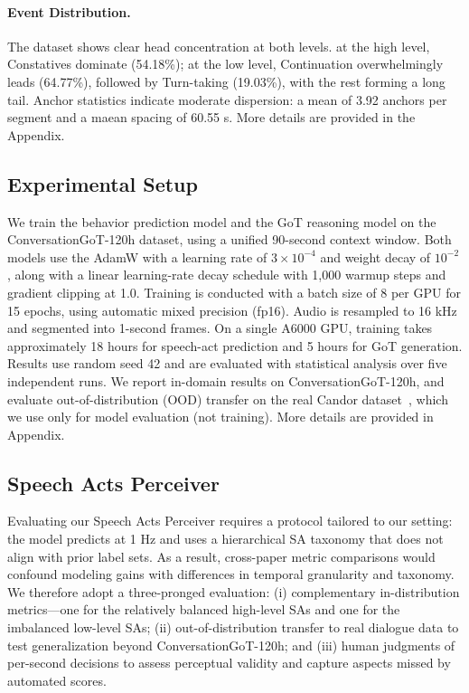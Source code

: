 \paragraph{Event Distribution.}
The dataset shows clear head concentration at both levels. at the high level, Constatives dominate (54.18\%); at the low level, Continuation overwhelmingly leads (64.77\%), followed by Turn-taking (19.03\%), with the rest forming a long tail. Anchor statistics indicate moderate dispersion: a mean of 3.92 anchors per segment and a maean spacing of 60.55 s. More details are provided in the Appendix.
\subsection{Experimental Setup}
We train the behavior prediction model and the GoT reasoning model on the ConversationGoT-120h dataset, using a unified 90-second context window. Both models use the AdamW \citep{loshchilov2017decoupled} with a learning rate of $3\times10^{-4}$ and weight decay of $10^{-2}$, along with a linear learning-rate decay schedule with 1{,}000 warmup steps and gradient clipping at 1.0. Training is conducted with a batch size of 8 per GPU for 15 epochs, using automatic mixed precision (fp16). Audio is resampled to 16 kHz and segmented into 1-second frames. On a single A6000 GPU, training takes approximately 18 hours for speech-act prediction and 5 hours for GoT generation. Results use random seed 42 and are evaluated with statistical analysis over five independent runs. We report in-domain results on ConversationGoT-120h, and evaluate out-of-distribution (OOD) transfer on the real Candor dataset~\citep{reece2022advancinginterdisciplinaryscienceconversation}, which we use only for model evaluation (not training). More details are provided in Appendix.

\subsection{Speech Acts Perceiver}
Evaluating our Speech Acts Perceiver requires a protocol tailored to our setting: the model predicts at 1 Hz and uses a hierarchical SA taxonomy that does not align with prior label sets. As a result, cross-paper metric comparisons would confound modeling gains with differences in temporal granularity and taxonomy. We therefore adopt a three-pronged evaluation: (i) complementary in-distribution metrics—one for the relatively balanced high-level SAs and one for the imbalanced low-level SAs; (ii) out-of-distribution transfer to real dialogue data to test generalization beyond ConversationGoT-120h; and (iii) human judgments of per-second decisions to assess perceptual validity and capture aspects missed by automated scores.
